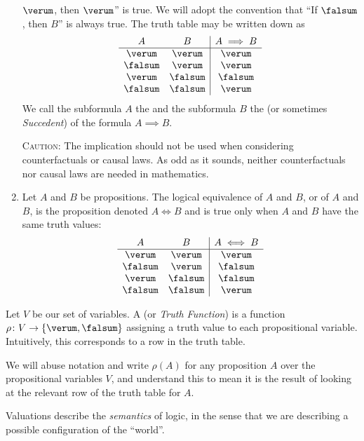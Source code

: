 \begin{node}[Semantics]
\begin{node}[Connectives]
\begin{enumerate}
  $\verum$, then $\verum$'' is true. We will adopt the convention that
  ``If $\falsum$, then $B$'' is always true. The truth table may be
  written down as
\[\begin{array}{cc|c}
A & B & A\implies B\\\hline
\verum  & \verum  & \verum\\
\falsum & \verum  & \verum\\
\verum  & \falsum & \falsum\\
\falsum & \falsum & \verum\\
\end{array}\]
We call the subformula $A$ the  and the subformula
$B$ the  (or sometimes \textit{Succedent}) of the
formula $A\implies B$.

\textsc{Caution:} The implication should not be used when considering
counterfactuals or causal laws. As odd as it sounds, neither
counterfactuals nor causal laws are needed in mathematics.
\item Let $A$ and $B$ be propositions. The logical equivalence of $A$
  and $B$, or  of $A$ and $B$, is the proposition
  denoted $A\iff B$ and is true only when $A$ and $B$ have the same
  truth values:
\[\begin{array}{cc|c}
A & B & A\iff B\\\hline
\verum  & \verum  & \verum\\
\falsum & \verum  & \falsum\\
\verum  & \falsum & \falsum\\
\falsum & \falsum & \verum\\
\end{array}\]
\end{enumerate}
\end{node}

\begin{node}\label{prop-0004}%
Let $V$ be our set of variables. A  (or
\textit{Truth Function}) is a function $\rho\colon V\to\{\verum,\falsum\}$
assigning a truth value to each propositional variable. Intuitively,
this corresponds to a row in the truth table.

We will abuse notation and write $\rho(A)$ for any proposition $A$ over
the propositional variables $V$, and understand this to mean it is the
result of looking at the relevant row of the truth table for $A$.

Valuations describe the \emph{semantics} of logic, in the sense
that we are describing a possible configuration of the ``world''.
\end{node}



\end{node}
